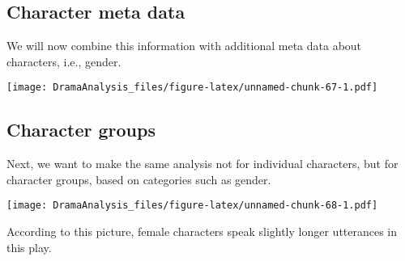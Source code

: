 \documentclass[]{book}
\newenvironment{Shaded}{\begin{snugshade}}{\end{snugshade}}
\newcommand{\CommentTok}[1]{\textcolor[rgb]{0.56,0.35,0.01}{\textit{#1}}}
\newcommand{\DataTypeTok}[1]{\textcolor[rgb]{0.13,0.29,0.53}{#1}}
\newcommand{\DecValTok}[1]{\textcolor[rgb]{0.00,0.00,0.81}{#1}}
\newcommand{\FloatTok}[1]{\textcolor[rgb]{0.00,0.00,0.81}{#1}}
\newcommand{\KeywordTok}[1]{\textcolor[rgb]{0.13,0.29,0.53}{\textbf{#1}}}
\newcommand{\NormalTok}[1]{#1}
\newcommand{\OperatorTok}[1]{\textcolor[rgb]{0.81,0.36,0.00}{\textbf{#1}}}
\newcommand{\OtherTok}[1]{\textcolor[rgb]{0.56,0.35,0.01}{#1}}
\newcommand{\StringTok}[1]{\textcolor[rgb]{0.31,0.60,0.02}{#1}}
\begin{document}
\hypertarget{character-meta-data}{%
\subsection{Character meta data}\label{character-meta-data}}

We will now combine this information with additional meta data about characters, i.e., gender.

\begin{Shaded}
\end{Shaded}

\texttt{[image: DramaAnalysis\_files/figure-latex/unnamed-chunk-67-1.pdf]}

\hypertarget{character-groups}{%
\subsection{Character groups}\label{character-groups}}

Next, we want to make the same analysis not for individual characters, but for character groups, based on categories such as gender.

\begin{Shaded}
\end{Shaded}

\texttt{[image: DramaAnalysis\_files/figure-latex/unnamed-chunk-68-1.pdf]}

According to this picture, female characters speak slightly longer utterances in this play.


\end{document}

